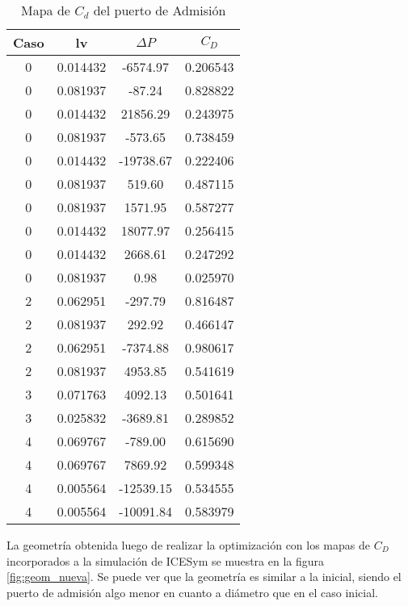 \begin{table}
  \centering
  \begin{tabular}{cccc} \toprule
      Caso  & lv        & $\Delta P$    & $C_{D}$   \\ \midrule
      0     & 0.014432  & -6574.97      &  0.206543 \\
      0     & 0.081937  & -87.24        &  0.828822 \\
      0     & 0.014432  & 21856.29      &  0.243975 \\
      0     & 0.081937  & -573.65       &  0.738459 \\
      0     & 0.014432  & -19738.67     &  0.222406 \\
      0     & 0.081937  & 519.60        &  0.487115 \\
      0     & 0.081937  & 1571.95       &  0.587277 \\
      0     & 0.014432  & 18077.97      &  0.256415 \\
      0     & 0.014432  & 2668.61       &  0.247292 \\
      0     & 0.081937  & 0.98          &  0.025970 \\
      2     & 0.062951  & -297.79       &  0.816487 \\
      2     & 0.081937  & 292.92        &  0.466147 \\
      2     & 0.062951  & -7374.88      &  0.980617 \\
      2     & 0.081937  & 4953.85       &  0.541619 \\
      3     & 0.071763  & 4092.13       &  0.501641 \\
      3     & 0.025832  & -3689.81      &  0.289852 \\
      4     & 0.069767  & -789.00       &  0.615690 \\
      4     & 0.069767  & 7869.92       &  0.599348 \\
      4     & 0.005564  & -12539.15     &  0.534555 \\
      4     & 0.005564  & -10091.84     &  0.583979 \\ \bottomrule
    \end{tabular}
  \caption{Mapa de $C_d$ del puerto de Admisión} \label{tab:mapa_cd_admision}
\end{table}


La geometría obtenida luego de realizar la optimización con los mapas de $C_D$
incorporados a la simulación de ICESym se muestra en la figura \ref{fig:geom_nueva}.
%
Se puede ver que la geometría es similar a la inicial, siendo el puerto de
admisión algo menor en cuanto a diámetro que en el caso inicial.

